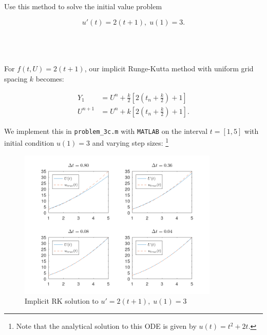 Use this method to solve the initial value problem

$$
u'(t) = 2(t + 1),\; u(1) = 3.
$$

\begin{solution}\ \\\\
    \ \\
    For $f(t, U) = 2(t + 1)$, our implicit Runge-Kutta method with uniform grid spacing $k$ becomes:
    
    \begin{align*}
        Y_1 &= U^n + \frac{k}{2} \left[2\left(t_n + \frac{k}{2}\right) + 1 \right] \\ 
        U^{n+1} &= U^n + k\left[2\left(t_n + \frac{k}{2}\right) + 1 \right].
    \end{align*}
    
    We implement this in \texttt{problem\_3c.m} with \texttt{MATLAB} on the interval $t = [1, 5]$ with initial condition 
    $u(1) = 3$ and varying step sizes: \footnote{
        Note that the analytical solution to this ODE is given by $u(t) = t^2 + 2t$.
    }
    
    \begin{figure}[h]
        \centering
        \includegraphics[width=0.85\textwidth]{problem_3c_solution.png}
        \caption[problem2b_solution]{Implicit RK solution to $u' = 2(t+1),\; u(1) = 3$}
    \end{figure}
\end{solution}